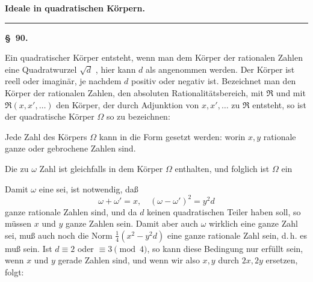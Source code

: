 
\begin{center}

\textbf{\Large Ideale in quadratischen K\"orpern.}

\rule{3cm}{0.4pt}
\end{center}

\begin{center}
\textbf{\S\ 90. }
\end{center}

Ein quadratischer K\"orper entsteht, wenn man dem K\"orper
der rationalen Zahlen eine Quadratwurzel $\sqrt{d}$ , hier
kann $d$ als  angenommen werden. Der K\"orper ist reell oder imagin\"ar, je nachdem $d$ positiv oder negativ ist. Bezeichnet man den K\"orper der
rationalen Zahlen, den absoluten Rationalit\"atsbereich, mit $\mathfrak{R}$ und
mit $\mathfrak{R}(x,x',\dots)$ den K\"orper, der durch Adjunktion von $x,x',\dots$
zu $\mathfrak{R}$ entsteht, so ist der quadratische K\"orper $\Omega$ so zu bezeichnen:

Jede Zahl des K\"orpers $\Omega$ kann in die Form gesetzt werden:
worin $x, y$ rationale ganze oder gebrochene Zahlen sind.

Die zu $\omega$  Zahl
ist gleichfalls in dem K\"orper $\Omega$ enthalten, und folglich ist $\Omega$ ein

Damit $\omega$ eine  sei, ist notwendig, da\ss
\[
\omega+\omega'=x,\quad(\omega-\omega')^2=y^2 d
\]
ganze rationale Zahlen sind, und da $d$ keinen quadratischen Teiler
haben soll, so m\"ussen $x$ und $y$ ganze Zahlen sein. Damit aber
auch $\omega$ wirklich eine ganze Zahl sei, mu\ss{} auch noch die Norm
$\frac{1}{4}(x^2-y^2 d)$ eine ganze rationale Zahl sein, d.\,h. es mu\ss
{}
sein. Ist $d\equiv 2$ oder $\equiv 3\pmod 4$, so kann diese Bedingung
nur erf\"ullt sein, wenn $x$ und $y$ gerade Zahlen sind, und wenn
wir also $x, y$ durch $2x, 2y$ ersetzen, folgt:

